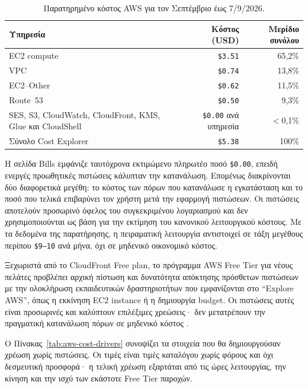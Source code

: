 \begin{table}[htbp]
\centering
\caption{Παρατηρημένο κόστος AWS για τον Σεπτέμβριο έως 7/9/2026.}
\label{tab:aws-observed-costs}
\small
\begin{tabularx}{0.92\textwidth}{Xrr}
\toprule
Υπηρεσία & Κόστος (USD) & Μερίδιο συνόλου \\
\midrule
EC2 compute & \texttt{\$3.51} & 65,2\% \\
VPC & \texttt{\$0.74} & 13,8\% \\
EC2--Other & \texttt{\$0.62} & 11,5\% \\
Route~53 & \texttt{\$0.50} & 9,3\% \\
SES, S3, CloudWatch, CloudFront, KMS, Glue και CloudShell & \texttt{\$0.00} ανά υπηρεσία & $<$0,1\% \\
\midrule
Σύνολο Cost Explorer & \texttt{\$5.38} & 100\% \\
\bottomrule
\end{tabularx}
\end{table}

Η σελίδα Bills εμφάνιζε ταυτόχρονα εκτιμώμενο πληρωτέο ποσό
\texttt{\$0.00}, επειδή ενεργές προωθητικές πιστώσεις κάλυπταν την
κατανάλωση. Επομένως διακρίνονται δύο διαφορετικά μεγέθη: το κόστος των
πόρων που κατανάλωσε η εγκατάσταση και το ποσό που τελικά επιβαρύνει τον
χρήστη μετά την εφαρμογή πιστώσεων. Οι πιστώσεις αποτελούν προσωρινό όφελος
του συγκεκριμένου λογαριασμού και δεν χρησιμοποιούνται ως βάση για την
εκτίμηση του κανονικού λειτουργικού κόστους. Με τα δεδομένα της παρατήρησης,
η πειραματική λειτουργία αντιστοιχεί σε τάξη μεγέθους περίπου
\texttt{\$9--10} ανά μήνα, όχι σε μηδενικό οικονομικό κόστος.

Ξεχωριστά από το CloudFront Free plan, το πρόγραμμα AWS Free Tier για νέους
πελάτες προβλέπει αρχική πίστωση και δυνατότητα απόκτησης πρόσθετων πιστώσεων
με την ολοκλήρωση εκπαιδευτικών δραστηριοτήτων που εμφανίζονται στο
\enquote{Explore AWS}, όπως η εκκίνηση EC2 instance ή η δημιουργία budget.
Οι πιστώσεις αυτές είναι προσωρινές και καλύπτουν επιλέξιμες χρεώσεις· δεν
μετατρέπουν την πραγματική κατανάλωση πόρων σε μηδενικό κόστος
\cite{aws2026freetieractivities}.

Ο Πίνακας~\ref{tab:aws-cost-drivers} συνοψίζει τα στοιχεία που θα
δημιουργούσαν χρέωση χωρίς πιστώσεις. Οι τιμές είναι τιμές καταλόγου χωρίς
φόρους και όχι δεσμευτική προσφορά· η τελική χρέωση εξαρτάται από τις ώρες
λειτουργίας, την κίνηση και την ισχύ των εκάστοτε Free Tier παροχών.

